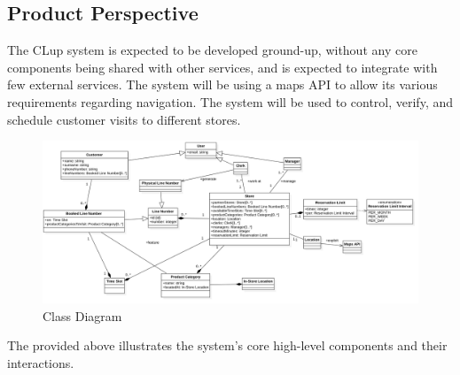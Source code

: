\subsection{Product Perspective}

The CLup system is expected to be developed ground-up, without any core components being shared with other services, and is expected to integrate with few external services.
The system will be using a maps API to allow its various requirements regarding navigation.
The system will be used to control, verify, and schedule customer visits to different stores.



\begin{figure}[H]
    \centering
    \includegraphics[height=0.5\textwidth]{Images/ClassDiagram.png}
    \caption{Class Diagram}
    \label{fig:ClassDiagram}
\end{figure}
The  provided above illustrates the system's core high-level components and their interactions.


